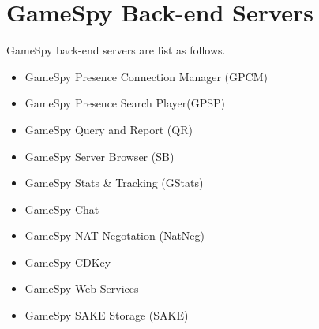 \documentclass[oneside,titlepage,a4paper]{Definition/retrospy} %
\begin{document}
\chapter{GameSpy Back-end Servers}
\par GameSpy back-end servers are list as follows.
	\begin{itemize}
		\item GameSpy Presence Connection Manager (GPCM)
		\item GameSpy Presence Search Player(GPSP)
		\item GameSpy Query and Report (QR)
		\item GameSpy Server Browser (SB)
		\item GameSpy Stats \& Tracking (GStats)
		\item GameSpy Chat
		\item GameSpy NAT Negotation (NatNeg)
		\item GameSpy CDKey 
		\item GameSpy Web Services
		\item GameSpy SAKE Storage (SAKE)
	\end{itemize}
\end{document}
